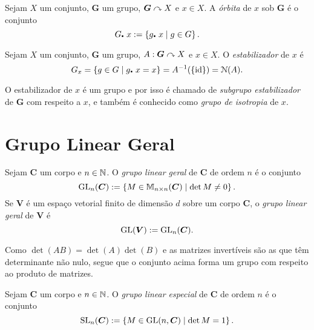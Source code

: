 \begin{defi}
Sejam $X$ um conjunto, $\bm G$ um grupo, $\bm G \curvearrowright X$ e $x \in X$. A \emph{órbita} de $x$ sob $\bm G$ é o conjunto
	\begin{equation*}
	G \mathord{\centerdot}\  x := \left\{g\mathord{\centerdot}\  x \;\middle\vert\; g \in G \right\}.
	\end{equation*}
\end{defi}

\begin{defi}
Sejam $X$ um conjunto, $\bm G$ um grupo, $A: \bm G \curvearrowright X$ e $x \in X$. O \emph{estabilizador} de $x$ é
	\begin{equation*}
	G_x = \left\{g \in G \;\middle\vert\; g\mathord{\centerdot}\  x = x \right\} = A^{-1}(\{\mathrm{id}\}) = \mathcal{N}(A).
	\end{equation*}
\end{defi}

O estabilizador de $x$ é um grupo e por isso é chamado de \emph{subgrupo estabilizador} de $\bm G$ com respeito a $x$, e também é conhecido como \emph{grupo de isotropia} de $x$.

\section{Grupo Linear Geral}

\begin{defi}
Sejam $\bm C$ um corpo e $n \in \mathbb{N}$. O \emph{grupo linear geral} de $\bm C$ de ordem $n$ é o conjunto
	\begin{equation*}
	\mathrm{GL}_n(\bm C) := \left\{M \in \mathbb{M}_{n\times n}(\bm C) \;\middle\vert\; \det M \neq 0 \right\}.
	\end{equation*}
Se $\bm V$ é um espaço vetorial finito de dimensão $d$ sobre um corpo $\bm C$, o \emph{grupo linear geral} de $\bm V$ é
	\begin{equation*}
	\mathrm{GL}(\bm V) := \mathrm{GL}_n(\bm C).
	\end{equation*}
\end{defi}

Como $\det(AB) = \det(A)\det(B)$ e as matrizes invertíveis são as que têm determinante não nulo, segue que o conjunto acima forma um grupo com respeito ao produto de matrizes.

\begin{defi}
Sejam $\bm C$ um corpo e $n \in \mathbb{N}$. O \emph{grupo linear especial} de $\bm C$ de ordem $n$ é o conjunto
	\begin{equation*}
	\mathrm{SL}_n(\bm C) := \left\{M \in \mathrm{GL}(n,\bm C) \;\middle\vert\; \det M =1 \right\}.
	\end{equation*}
\end{defi}


